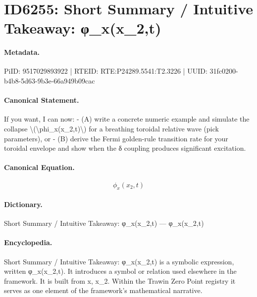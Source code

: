 \section*{ID6255: Short Summary / Intuitive Takeaway: φ\_x(x\_2,t)}
\paragraph{Metadata.}
PiID: 9517029893922 | RTEID: RTE:P24289.5541:T2.3226 | UUID: 31fc0200-b4b8-5d63-9b3e-66a949b09cac

\paragraph{Canonical Statement.}
If you want, I can now: - (A) write a concrete numeric example and simulate the collapse \textbackslash{}(\textbackslash{}phi\_x(x\_2,t)\textbackslash{}) for a breathing toroidal relative wave (pick parameters), or - (B) derive the Fermi golden-rule transition rate for your toroidal envelope and show when the δ coupling produces significant excitation.

\paragraph{Canonical Equation.}
\[
\phi_x(x_2,t)
\]

\paragraph{Dictionary.}
Short Summary / Intuitive Takeaway: φ\_x(x\_2,t) — φ\_x(x\_2,t)

\paragraph{Encyclopedia.}
Short Summary / Intuitive Takeaway: φ\_x(x\_2,t) is a symbolic expression, written φ\_x(x\_2,t). It introduces a symbol or relation used elsewhere in the framework. It is built from x, x\_2. Within the Trawin Zero Point registry it serves as one element of the framework's mathematical narrative.
